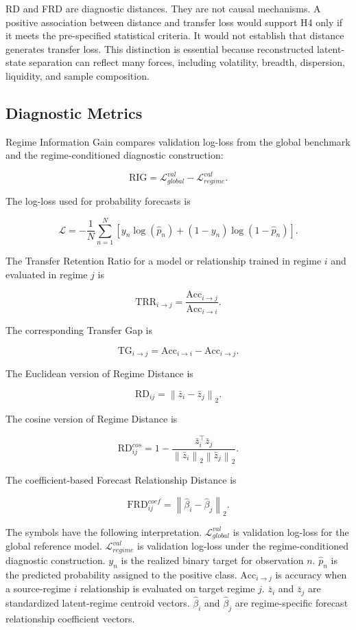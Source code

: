 \documentclass[12pt,a4paper]{article}
\begin{document}
RD and FRD are diagnostic distances. They are not causal mechanisms. A positive association between distance and transfer loss would support H4 only if it meets the pre-specified statistical criteria. It would not establish that distance generates transfer loss. This distinction is essential because reconstructed latent-state separation can reflect many forces, including volatility, breadth, dispersion, liquidity, and sample composition.

\subsection{Diagnostic Metrics}

Regime Information Gain compares validation log-loss from the global benchmark and the regime-conditioned diagnostic construction:

\[
\mathrm{RIG}
=
\mathcal{L}^{val}_{global}
-
\mathcal{L}^{val}_{regime}.
\]

The log-loss used for probability forecasts is

\[
\mathcal{L}
=
-\frac{1}{N}
\sum_{n=1}^{N}
\left[
y_n \log(\hat{p}_n)
+
(1-y_n)\log(1-\hat{p}_n)
\right].
\]

The Transfer Retention Ratio for a model or relationship trained in regime \(i\) and evaluated in regime \(j\) is

\[
\mathrm{TRR}_{i \rightarrow j}
=
\frac{
\mathrm{Acc}_{i \rightarrow j}
}{
\mathrm{Acc}_{i \rightarrow i}
}.
\]

The corresponding Transfer Gap is

\[
\mathrm{TG}_{i \rightarrow j}
=
\mathrm{Acc}_{i \rightarrow i}
-
\mathrm{Acc}_{i \rightarrow j}.
\]

The Euclidean version of Regime Distance is

\[
\mathrm{RD}_{ij}
=
\left\lVert
\bar{z}_i - \bar{z}_j
\right\rVert_2.
\]

The cosine version of Regime Distance is

\[
\mathrm{RD}^{cos}_{ij}
=
1 -
\frac{
\bar{z}_i^\top \bar{z}_j
}{
\left\lVert\bar{z}_i\right\rVert_2
\left\lVert\bar{z}_j\right\rVert_2
}.
\]

The coefficient-based Forecast Relationship Distance is

\[
\mathrm{FRD}^{coef}_{ij}
=
\left\lVert
\hat{\beta}_i - \hat{\beta}_j
\right\rVert_2.
\]

The symbols have the following interpretation. \(\mathcal{L}^{val}_{global}\) is validation log-loss for the global reference model. \(\mathcal{L}^{val}_{regime}\) is validation log-loss under the regime-conditioned diagnostic construction. \(y_n\) is the realized binary target for observation \(n\). \(\hat{p}_n\) is the predicted probability assigned to the positive class. \(\mathrm{Acc}_{i \rightarrow j}\) is accuracy when a source-regime \(i\) relationship is evaluated on target regime \(j\). \(\bar{z}_i\) and \(\bar{z}_j\) are standardized latent-regime centroid vectors. \(\hat{\beta}_i\) and \(\hat{\beta}_j\) are regime-specific forecast relationship coefficient vectors.
\end{document}

